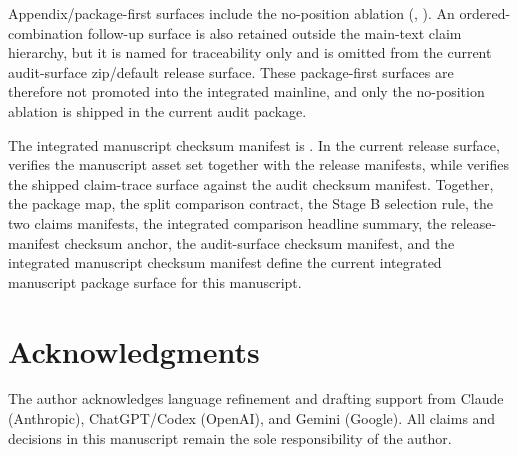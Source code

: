\documentclass[11pt,a4paper]{article}
\begin{document}
Appendix/package-first surfaces include the no-position ablation
(, ).
An ordered-combination follow-up surface is also retained outside the main-text
claim hierarchy, but it is named for traceability only and is omitted from the
current audit-surface zip/default release surface. These package-first surfaces
are therefore not promoted into the integrated mainline, and only the no-position
ablation is shipped in the current audit package.

The integrated manuscript checksum manifest is
. In the current
release surface,  verifies the manuscript
asset set together with the release manifests, while
 verifies the shipped claim-trace surface
against the audit checksum manifest. Together, the package map, the split
comparison contract, the Stage B selection rule, the two claims manifests, the
integrated comparison headline summary, the release-manifest checksum anchor,
the audit-surface checksum manifest, and the integrated manuscript checksum
manifest define the current integrated manuscript package surface for this manuscript.

\section*{Acknowledgments}
The author acknowledges language refinement and drafting support from Claude
(Anthropic), ChatGPT/Codex (OpenAI), and Gemini (Google). All claims and
decisions in this manuscript remain the sole responsibility of the author.
\end{document}
